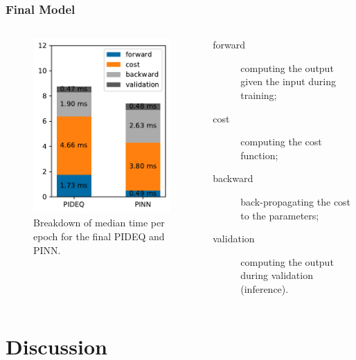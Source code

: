 \documentclass[t]{beamer}
\begin{document}
\begin{frame}
    \frametitle{Final Model}
    \begin{columns}[T] 
	\begin{column}{.6\textwidth}
	    \vspace{-10pt}
	    \begin{figure}[h]
	        \centering
		\includegraphics[width=.6\textwidth]{../images/final_times.pdf}
		\caption{Breakdown of median time per epoch for the final PIDEQ and PINN.}
		\label{fig:final-times}
	    \end{figure}
        \end{column}
	\begin{column}{.4\textwidth} 
	    \begin{description}
		\item[\textcolor{tabblue}{forward}] computing the output given the input during training;
		\item[\textcolor{taborange}{cost}] computing the cost function;
		\item[\textcolor{tabgray}{backward}] back-propagating the cost to the parameters;
		\item[\textcolor{tabdarkgray}{validation}] computing the output during validation (inference).
	    \end{description}
	\end{column}
    \end{columns}
    
\end{frame}

\section{Discussion}
\end{document}
